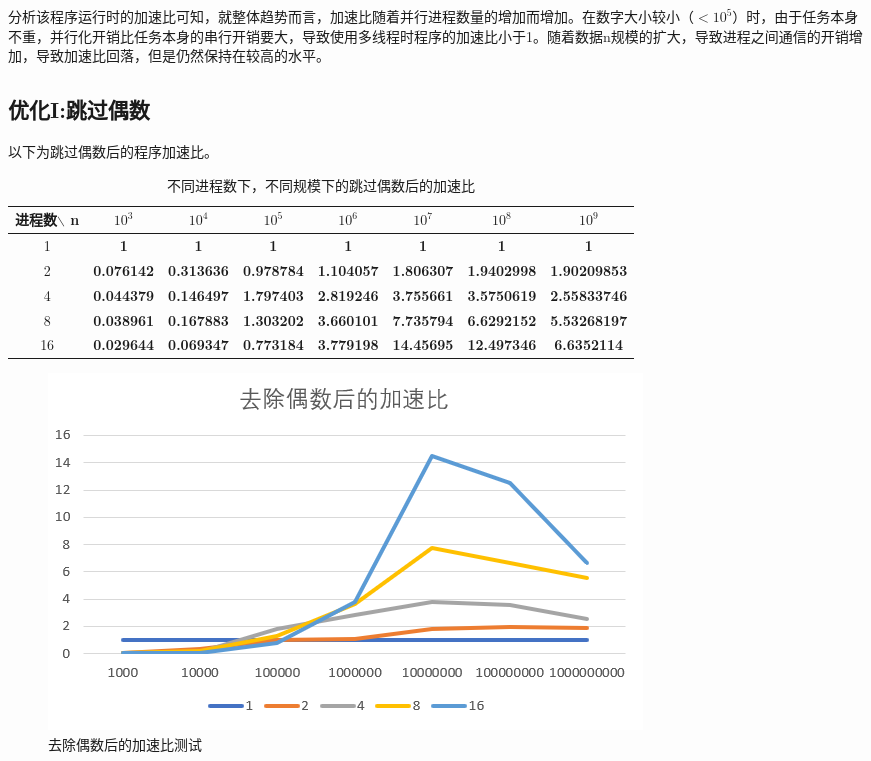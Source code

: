 \documentclass[a4paper,11pt,UTF8]{ctexart}
\begin{document}
分析该程序运行时的加速比可知，就整体趋势而言，加速比随着并行进程数量的增加而增加。在数字大小较小（$<10^5$）时，由于任务本身不重，并行化开销比任务本身的串行开销要大，导致使用多线程时程序的加速比小于1。随着数据n规模的扩大，导致进程之间通信的开销增加，导致加速比回落，但是仍然保持在较高的水平。
\newpage
\subsection{优化I:跳过偶数}
以下为跳过偶数后的程序加速比。
\begin{table}[ht]
  \centering
  \caption{不同进程数下，不同规模下的跳过偶数后的加速比}
  \begin{tabular}{cccccccc}
    \toprule
    进程数$\backslash$ n & $10^3$             & $10^4$            & $10^5$           & $10^6$          & $10^7$          & $10^8$         & $10^9$         \\\midrule
    1   & \textbf{1}       & \textbf{1}       & \textbf{1}       & \textbf{1}       & \textbf{1}        & \textbf{1}        & \textbf{1}         \\
    2  & \textbf{0.076142} & \textbf{0.313636} & \textbf{0.978784} & \textbf{1.104057} & \textbf{1.806307} & \textbf{1.9402998} & \textbf{1.90209853} \\
    4  & \textbf{0.044379} & \textbf{0.146497} & \textbf{1.797403} & \textbf{2.819246} & \textbf{3.755661} & \textbf{3.5750619} & \textbf{2.55833746} \\
    8  & \textbf{0.038961} & \textbf{0.167883} & \textbf{1.303202} & \textbf{3.660101} & \textbf{7.735794} & \textbf{6.6292152} & \textbf{5.53268197} \\
    16 & \textbf{0.029644} & \textbf{0.069347} & \textbf{0.773184} & \textbf{3.779198} & \textbf{14.45695} & \textbf{12.497346} & \textbf{6.6352114} \\\bottomrule
    \end{tabular}
  \label{label}
    \end{table}
  \begin {figure}[h]
  \centering %
  \includegraphics[width=\textwidth]{4502-041410.png}
  \caption{去除偶数后的加速比测试} %
  \label{five}
  \end {figure}
\end{document}
